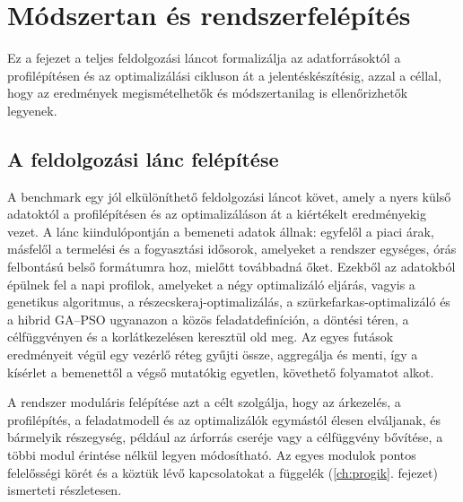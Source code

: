 \chapter{Módszertan és rendszerfelépítés}\label{ch:MODSZERTAN}

\begin{osszefoglal}
Ez a fejezet a teljes feldolgozási láncot formalizálja az adatforrásoktól a profilépítésen és az optimalizálási cikluson át a jelentéskészítésig, azzal a céllal, hogy az eredmények megismételhetők és módszertanilag is ellenőrizhetők legyenek.
\end{osszefoglal}

\section{A feldolgozási lánc felépítése}
A benchmark egy jól elkülöníthető feldolgozási láncot követ, amely a nyers külső adatoktól a profilépítésen és az optimalizáláson át a kiértékelt eredményekig vezet. A lánc kiindulópontján a bemeneti adatok állnak: egyfelől a piaci árak, másfelől a termelési és a fogyasztási idősorok, amelyeket a rendszer egységes, órás felbontású belső formátumra hoz, mielőtt továbbadná őket. Ezekből az adatokból épülnek fel a napi profilok, amelyeket a négy optimalizáló eljárás, vagyis a genetikus algoritmus, a részecskeraj-optimalizálás, a szürkefarkas-optimalizáló és a hibrid GA--PSO ugyanazon a közös feladatdefiníción, a döntési téren, a célfüggvényen és a korlátkezelésen keresztül old meg. Az egyes futások eredményeit végül egy vezérlő réteg gyűjti össze, aggregálja és menti, így a kísérlet a bemenettől a végső mutatókig egyetlen, követhető folyamatot alkot.

A rendszer moduláris felépítése azt a célt szolgálja, hogy az árkezelés, a profilépítés, a feladatmodell és az optimalizálók egymástól élesen elváljanak, és bármelyik részegység, például az árforrás cseréje vagy a célfüggvény bővítése, a többi modul érintése nélkül legyen módosítható. Az egyes modulok pontos felelősségi körét és a köztük lévő kapcsolatokat a függelék (\ref{ch:progik}. fejezet) ismerteti részletesen.

